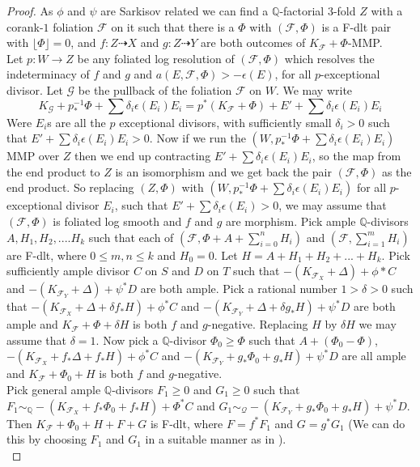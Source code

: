 \documentclass[12pt]{amsart}%
\theoremstyle{plain}
\theoremstyle{remark}
\theoremstyle{definition}
\newcommand{\<}{\leq}
\newcommand{\mbQ}{\mathbb{Q}}
\theoremstyle{definition}
\theoremstyle{definition}
\numberwithin{equation}{section}
\theoremstyle{remark}
\begin{document}
\begin{proof}
    As $\phi$ and $\psi$ are Sarkisov related we can find a $\mbQ$-factorial $3$-fold $Z$ with a corank-$1$ foliation $\mathcal{F}$ on it such that there is a $\Phi$ with $(\mathcal{F},\Phi)$ is a F-dlt pair with $\lfloor \Phi\rfloor=0$, and $f:Z\dashrightarrow X$ and $g:Z\dashrightarrow Y$ are both outcomes of $K_{\mathcal{F}}+\Phi$-MMP.\\
    Let $p:W\rightarrow Z$ be any foliated log resolution of $(\mathcal{F},\Phi)$ which resolves the indeterminacy of $f$ and $g$ and $a(E,\mathcal{F},\Phi)>-\epsilon(E)$, for all $p$-exceptional divisor. Let $\mathcal{G}$ be the pullback of the foliation $\mathcal{F}$ on $W$. We may write \[
    K_{\mathcal{G}}+p_*^{-1}\Phi+\sum \delta_i\epsilon(E_i)E_i=p^*(K_{\mathcal{F}}+\Phi)+E'+\sum \delta_i\epsilon(E_i)E_i
    \] 
    Were $E_i$s are all the $p$ exceptional divisors, with sufficiently small $\delta_i>0$ such that $E'+\sum\delta_i\epsilon(E_i)E_i>0$. Now if we run the $(W,p_*^{-1}\Phi+\sum\delta_i\epsilon(E_i)E_i)$ MMP over $Z$ then we end up contracting $E'+\sum\delta_i\epsilon(E_i)E_i$, so the map from the end product to $Z$ is an isomorphism and we get back the pair $(\mathcal{F},\Phi)$ as the end product. So replacing $(Z,\Phi)$ with $(W,p_*^{-1}\Phi+\sum \delta_i\epsilon(E_i)E_i)$ for all $p$-exceptional divisor $E_i$, such that $E'+\sum \delta_i\epsilon(E_i)>0$, we may assume that $(\mathcal{F},\Phi)$ is foliated log smooth and $f$ and $g$ are morphism.
    Pick ample $\mbQ$-divisors $A,H_1,H_2,....H_k$ such that each of $(\mathcal{F},\Phi+A+\sum_{i=0}^n H_i)$ and $(\mathcal{F},\sum_{i=1}^m H_i)$ are F-dlt, where $0\leqslant m,n\leqslant k$ and $H_0=0$. Let $H=A+H_1+H_2+...+H_k$. Pick sufficiently ample divisor $C$ on $S$ and $D$ on $T$ such that $-(K_{\mathcal{F}_{X}}+\Delta)+\phi*C$ and $-(K_{\mathcal{F}_Y}+\Delta)+\psi^*D$ are both ample. Pick a rational number $1>\delta>0$ such that $-(K_{\mathcal{F}_X}+\Delta+\delta f_*H)+\phi^*C$ and $-(K_{\mathcal{F}_Y}+\Delta+\delta g_*H)+\psi^*D$ are both ample and $K_{\mathcal{F}}+\Phi+\delta H$ is both $f$ and $g$-negative. Replacing $H$ by $\delta H$ we may assume that $\delta=1$. Now pick a $\mbQ$-divisor $\Phi_0\geqslant \Phi$ such that $A+(\Phi_0-\Phi)$, $-(K_{\mathcal{F}_X}+f_*\Delta+f_*H)+\phi^*C$ and $-(K_{\mathcal{F}_Y}+g_*\Phi_0+g_*H)+\psi^*D$ are all ample and $K_{\mathcal{F}}+\Phi_0+H$ is both $f$ and $g$-negative.\\
    Pick general ample $\mbQ$-divisors $F_1\geqslant 0$ and $G_1\geqslant 0$ such that $F_1\sim_{\mbQ}-(K_{\mathcal{F}_X}+f_*\Phi_0+f_*H)+\Phi^*C$ and $G_1\sim_{\mathcal{Q}}-(K_{\mathcal{F}_Y}+g_*\Phi_0+g_*H)+\psi^*D$. Then $K_{\mathcal{F}}+\Phi_0+H+F+G$ is F-dlt, where $F=f^*F_1$ and $G=g^*G_1$ (We can do this by choosing $F_1$ and $G_1$ in a suitable manner as in \cite[Lemma $3.24$]{CS21}).\\

\end{proof}
\end{document}
